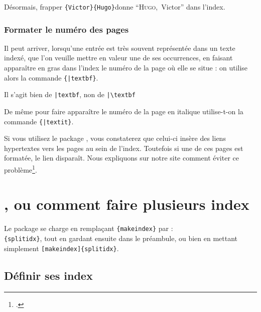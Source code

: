 Désormais, frapper \verb|{Victor}{Hugo}|donne
 \enquote{\textsc{Hugo},~Victor} dans l'index.
 
 

\subsubsection{Formater le numéro des pages}

Il peut arriver, lorsqu'une entrée est très souvent représentée dans un texte indexé, que l'on veuille mettre en valeur une de ses occurrences, en faisant apparaître en gras dans l'index le numéro de la page où elle se situe : on utilise alors la commande \verb|{|\verb+|textbf}+. 

\begin{attention}
Il s'agit bien de \verb+|textbf+, non de \verb+|\textbf+
\end{attention}

De même pour faire apparaître le numéro de la page en italique utilise-t-on la commande \verb|{|\verb+|textit}+.





\begin{plusloins}
Si vous utilisez le package , vous constaterez que celui-ci insère des liens hypertextes vers les pages au sein de l'index. Toutefois si une de ces pages est formatée, le lien disparaît. Nous expliquons sur notre site comment éviter ce problème\footcite{indexhypergras}.
\end{plusloins}



\section{, ou comment faire plusieurs index} \label{splitindex}


Le package se charge en remplaçant \verb|{makeindex}| par : \\ 
\verb|{splitidx}|, tout en gardant ensuite  dans le préambule, ou bien en mettant simplement  \verb|[makeindex]{splitidx}|.

\subsection{Définir ses index}

